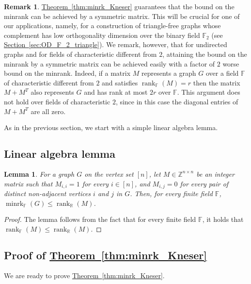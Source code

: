 \documentclass[11pt]{article}
\numberwithin{equation}{section}
\newtheorem{lemma}[theorem]{Lemma}
\theoremstyle{definition}
\newtheorem{remark}[theorem]{Remark}
\theoremstyle{plain}
\newcommand{\R}{\mathbb R}
\newcommand{\Z}{\mathbb Z}
\newcommand{\expref}[2]{\hyperref[#2]{#1~\ref{#2}}}
\newcommand{\Fset}{\mathbb{F}}
\newcommand{\rank}{\mathop{\mathrm{rank}}}
\newcommand{\minrank}{\mathop{\mathrm{minrk}}}
\begin{document}
\begin{remark}\label{remark:symmetric}
\expref{Theorem}{thm:minrk_Kneser} guarantees that the bound on the minrank can be achieved by a symmetric matrix.
This will be crucial for one of our applications, namely, for a construction of triangle-free graphs whose complement has low orthogonality dimension over the binary field $\Fset_2$ (see \expref{Section}{sec:OD_F_2_triangle}).
We remark, however, that for undirected graphs and for fields of characteristic different from $2$, attaining the bound on the minrank by a symmetric matrix can be achieved easily with a factor of $2$ worse bound on the minrank. Indeed, if a matrix $M$ represents a graph $G$ over a field $\Fset$ of characteristic different from $2$ and satisfies ${\rank}_{\Fset}(M) = r$ then the matrix $M+M^T$ also represents $G$ and has rank at most $2r$ over $\Fset$.
This argument does not hold over fields of characteristic $2$, since in this case the diagonal entries of $M+M^T$ are all %
zero.  %
\end{remark}


As in the previous section, we start with a simple linear algebra lemma.

\subsection{Linear algebra lemma}

\begin{lemma}\label{lemma:rankp_R}
  For a graph $G$ on the vertex set $[n]$, let $M \in \Z^{n \times n}$ be an integer matrix such that $M_{i,i}=1$ for every $i \in [n]$, and $M_{i,j} = 0$ for every
pair of  %
distinct non-adjacent vertices $i$ and $j$ in $G$. Then, for every finite field $\Fset$, ${\minrank}_{\Fset}(G) \leq \rank_\R(M)$.
\end{lemma}

%
\begin{proof}
The lemma follows from the fact that for every finite field $\Fset$, it holds that $\rank_{\Fset} (M) \leq \rank_{\R} (M)$.
\end{proof}

%
%
%
%
%
%
%
%
%
%
%
%
%
%
%
%
%
%
%
%
%
%
%
%
%
%
%
%
%
%
%

\subsection{Proof of \expref{Theorem}{thm:minrk_Kneser}}

We are ready to prove \expref{Theorem}{thm:minrk_Kneser}.
\end{document}
